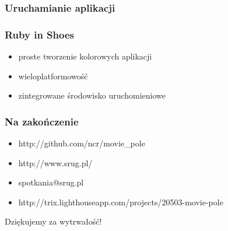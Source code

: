 \documentclass[12t]{beamer}
\begin{document}
\begin{frame}[fragile]
  \frametitle{Uruchamianie aplikacji}
  \begin{small}
    
  \end{small}
\end{frame}

\begin{frame}[fragile]
  \frametitle{Ruby in Shoes}
  \begin{itemize}
  \item proste tworzenie kolorowych aplikacji
  \item wieloplatformowość
  \item zintegrowane środowisko uruchomieniowe
  \end{itemize}
\end{frame}

\begin{frame}
  \frametitle{Na zakończenie}
  \begin{itemize}
  \item http://github.com/ncr/movie\_pole
  \item http://www.srug.pl/
  \item spotkania@srug.pl
  \item http://trix.lighthouseapp.com/projects/20503-movie-pole
  \end{itemize}
\end{frame}

\begin{frame}
  \begin{center}
    \begin{Large}
      Dziękujemy za wytrwałość!
    \end{Large}
  \end{center}
\end{frame}
\end{document}
